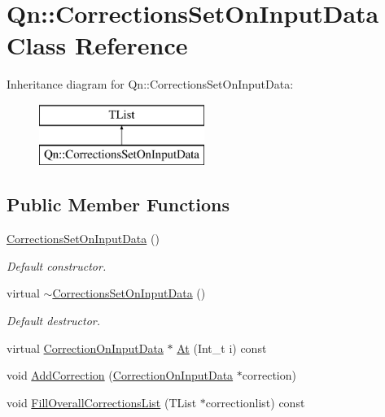 \hypertarget{classQn_1_1CorrectionsSetOnInputData}{}\section{Qn\+:\+:Corrections\+Set\+On\+Input\+Data Class Reference}
\label{classQn_1_1CorrectionsSetOnInputData}
Inheritance diagram for Qn\+:\+:Corrections\+Set\+On\+Input\+Data\+:\begin{figure}[H]
\begin{center}
\leavevmode
\includegraphics[height=2.000000cm]{classQn_1_1CorrectionsSetOnInputData}
\end{center}
\end{figure}
\subsection*{Public Member Functions}
\begin{DoxyCompactItemize}
\item 
\mbox{\label{classQn_1_1CorrectionsSetOnInputData_a38a9a90d6071c5af09a4ed6a30c0bb0f}} 
\mbox{\hyperlink{classQn_1_1CorrectionsSetOnInputData_a38a9a90d6071c5af09a4ed6a30c0bb0f}{Corrections\+Set\+On\+Input\+Data}} ()
\begin{DoxyCompactList}\small\item\em Default constructor. \end{DoxyCompactList}\item 
\mbox{\label{classQn_1_1CorrectionsSetOnInputData_a29c9c3d13112653a7e163d3aa7615c6c}} 
virtual \mbox{\hyperlink{classQn_1_1CorrectionsSetOnInputData_a29c9c3d13112653a7e163d3aa7615c6c}{$\sim$\+Corrections\+Set\+On\+Input\+Data}} ()
\begin{DoxyCompactList}\small\item\em Default destructor. \end{DoxyCompactList}\item 
virtual \mbox{\hyperlink{classQn_1_1CorrectionOnInputData}{Correction\+On\+Input\+Data}} $\ast$ \mbox{\hyperlink{classQn_1_1CorrectionsSetOnInputData_a7d23f9a8c9f61fbe94b2b2257b599c06}{At}} (Int\+\_\+t i) const
\item 
void \mbox{\hyperlink{classQn_1_1CorrectionsSetOnInputData_ae7bc47aa87b78daca76889e45952766a}{Add\+Correction}} (\mbox{\hyperlink{classQn_1_1CorrectionOnInputData}{Correction\+On\+Input\+Data}} $\ast$correction)
\item 
void \mbox{\hyperlink{classQn_1_1CorrectionsSetOnInputData_af1489e16bd450a64cbb33654e7559568}{Fill\+Overall\+Corrections\+List}} (T\+List $\ast$correctionlist) const
\end{DoxyCompactItemize}


